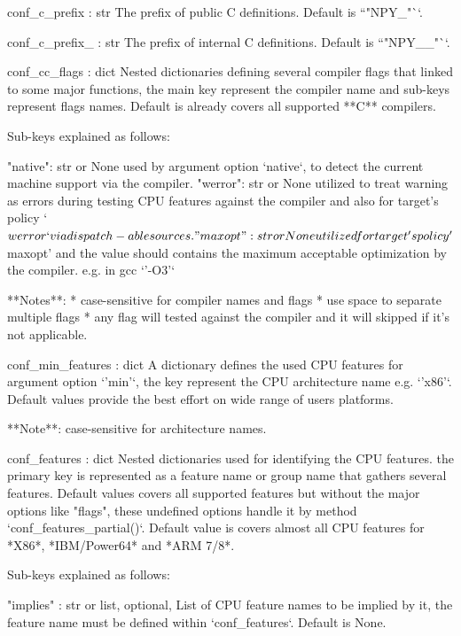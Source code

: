 \begin{DoxyVerb}
conf_c_prefix : str
    The prefix of public C definitions. Default is ``"NPY_"``.

conf_c_prefix_ : str
    The prefix of internal C definitions. Default is ``"NPY__"``.

conf_cc_flags : dict
    Nested dictionaries defining several compiler flags
    that linked to some major functions, the main key
    represent the compiler name and sub-keys represent
    flags names. Default is already covers all supported
    **C** compilers.

    Sub-keys explained as follows:

    "native": str or None
        used by argument option `native`, to detect the current
        machine support via the compiler.
    "werror": str or None
        utilized to treat warning as errors during testing CPU features
        against the compiler and also for target's policy `$werror`
        via dispatch-able sources.
    "maxopt": str or None
        utilized for target's policy '$maxopt' and the value should
        contains the maximum acceptable optimization by the compiler.
        e.g. in gcc `'-O3'`

    **Notes**:
        * case-sensitive for compiler names and flags
        * use space to separate multiple flags
        * any flag will tested against the compiler and it will skipped
          if it's not applicable.

conf_min_features : dict
    A dictionary defines the used CPU features for
    argument option `'min'`, the key represent the CPU architecture
    name e.g. `'x86'`. Default values provide the best effort
    on wide range of users platforms.

    **Note**: case-sensitive for architecture names.

conf_features : dict
    Nested dictionaries used for identifying the CPU features.
    the primary key is represented as a feature name or group name
    that gathers several features. Default values covers all
    supported features but without the major options like "flags",
    these undefined options handle it by method `conf_features_partial()`.
    Default value is covers almost all CPU features for *X86*, *IBM/Power64*
    and *ARM 7/8*.

    Sub-keys explained as follows:

    "implies" : str or list, optional,
        List of CPU feature names to be implied by it,
        the feature name must be defined within `conf_features`.
        Default is None.


\end{DoxyVerb}

